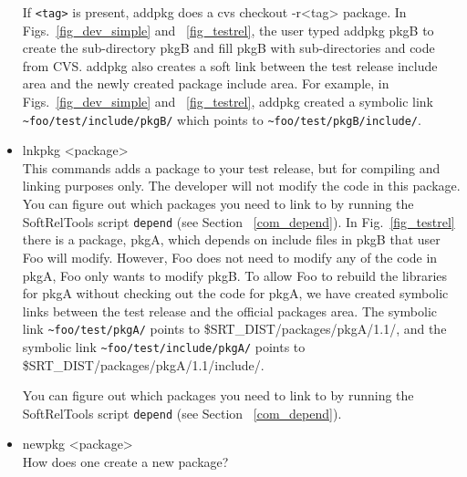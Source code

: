 \documentclass[12pt]{article}
\begin{document}
\begin{itemize}
If \texttt{<tag>} is present, {\ttfamily addpkg} does a 
{\ttfamily cvs checkout -r<tag> package}.  
 In
Figs.~\ref{fig_dev_simple} and ~\ref{fig_testrel}, the user typed 
{\ttfamily addpkg pkgB} 
to create the sub-directory {\ttfamily pkgB} and fill
{\ttfamily pkgB} with sub-directories and code from CVS. {\ttfamily addpkg} 
also creates a soft link between the test release include area and the newly 
created package include area.  For example, in 
Figs.~\ref{fig_dev_simple} and ~\ref{fig_testrel}, {\ttfamily addpkg}
created a symbolic link \verb|~foo/test/include/pkgB/| which points to
\verb|~foo/test/pkgB/include/|. 


\item {\ttfamily lnkpkg <package>}\\
This commands adds a package to your test release, but for compiling
and linking purposes only. The developer will not modify the code
in this package. 
You can figure out which packages you need
to link to by running the SoftRelTools script \texttt{depend} 
(see Section ~\ref{com_depend}).      
In Fig.~\ref{fig_testrel} there is a package, {\ttfamily pkgA}, which 
depends on include files in {\ttfamily pkgB} that user Foo will modify.  
However, Foo does not need to modify any of the code in {\ttfamily pkgA}, 
Foo only wants to modify {\ttfamily pkgB}.  To allow Foo to rebuild the 
libraries for {\ttfamily pkgA} without checking out the code for {\ttfamily
pkgA}, we have created symbolic links between the test release and the
official packages area.  The symbolic link \verb|~foo/test/pkgA/| points to 
\$SRT\_DIST/packages/pkgA/1.1/, and the symbolic link 
\verb|~foo/test/include/pkgA/| points to \$SRT\_DIST/packages/pkgA/1.1/include/.  

You can figure out which packages you need
to link to by running the SoftRelTools script \texttt{depend} 
(see Section ~\ref{com_depend}).      

\item{\ttfamily newpkg <package>}\\
How does one create a new package?

\end{itemize}
\end{document}
